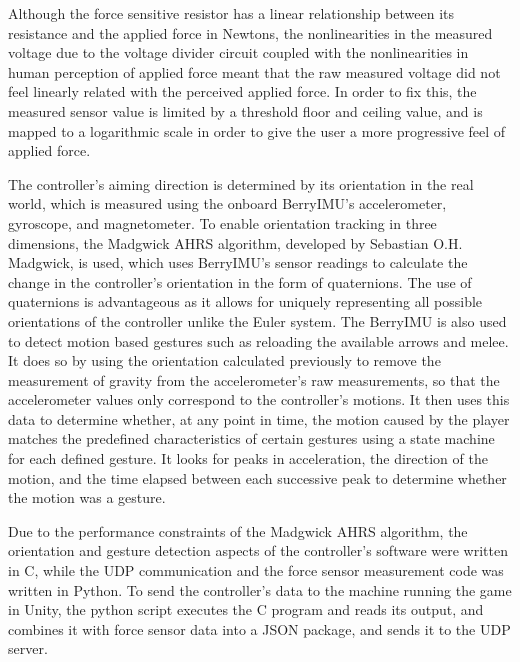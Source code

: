 \documentclass[titlepage, 12pt]{scrartcl}
\begin{document}
    Although the force sensitive resistor has a linear relationship between its resistance and the applied force in Newtons, the nonlinearities in the measured voltage due to the voltage divider circuit coupled with the nonlinearities in human perception of applied force meant that the raw measured voltage did not feel linearly related with the perceived applied force. In order to fix this, the measured sensor value is limited by a threshold floor and ceiling value, and is mapped to a logarithmic scale in order to give the user a more progressive feel of applied force. \par
   The controller's aiming direction is determined by its orientation in the real world, which is measured using the onboard BerryIMU's accelerometer, gyroscope, and magnetometer. To enable orientation tracking in three dimensions, the Madgwick AHRS algorithm, developed by Sebastian O.H. Madgwick, is used, which uses BerryIMU's sensor readings to calculate the change in the controller's orientation in the form of quaternions. The use of quaternions is advantageous as it allows for uniquely representing all possible orientations of the controller unlike the Euler system. The BerryIMU is also used to detect motion based gestures such as reloading the available arrows and melee. It does so by using the orientation calculated previously to remove the measurement of gravity from the accelerometer's raw measurements, so that the accelerometer values only correspond to the controller's motions. It then uses this data to determine whether, at any point in time, the motion caused by the player matches the predefined characteristics of certain gestures using a state machine for each defined gesture. It looks for peaks in acceleration, the direction of the motion, and the time elapsed between each successive peak to determine whether the motion was a gesture. \par
   Due to the performance constraints of the Madgwick AHRS algorithm, the orientation and gesture detection aspects of the controller's software were written in C, while the UDP communication and the force sensor measurement code was written in Python. To send the controller's data to the machine running the game in Unity, the python script executes the C program and reads its output, and combines it with force sensor data into a JSON package, and sends it to the UDP server. \par
\end{document}
